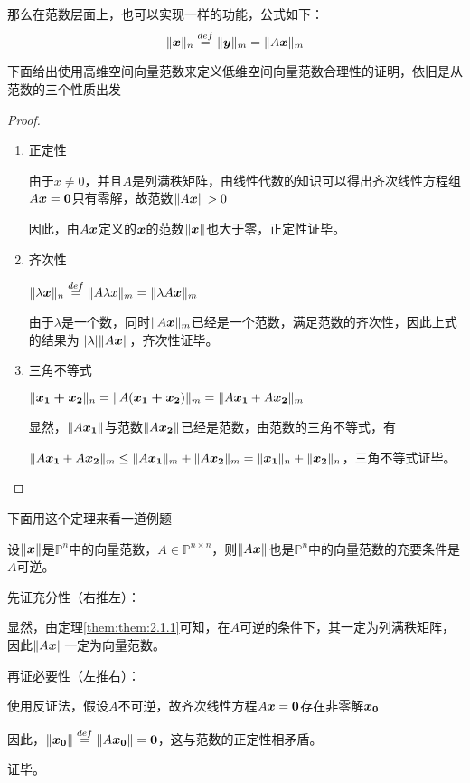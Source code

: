 \documentclass[12pt, a4paper, oneside, UTF8]{ctexbook}
\begin{document}
那么在范数层面上，也可以实现一样的功能，公式如下：
\[\Vert\boldsymbol{x}\Vert_n\overset{def}{=}\Vert\boldsymbol{y}\Vert_m=\Vert A\boldsymbol{x}\Vert_m\]


下面给出使用高维空间向量范数来定义低维空间向量范数合理性的证明，依旧是从范数的三个性质出发

\begin{proof}
    \begin{enumerate}[leftmargin=4em]
        \item 正定性
        
            由于$x\neq 0$，并且$A$是列满秩矩阵，由线性代数的知识可以得出齐次线性方程组$A\boldsymbol{x}=\boldsymbol{0}$只有零解，故范数$\Vert A\boldsymbol{x}\Vert>0$

            因此，由$A\boldsymbol{x}$定义的$\boldsymbol{x}$的范数$\Vert\boldsymbol{x}\Vert$也大于零，正定性证毕。
        \item 齐次性
        
        $\Vert\lambda\boldsymbol{x}\Vert_n\overset{def}{=}\Vert A\lambda x\Vert_m=\Vert\lambda A\boldsymbol{x}\Vert_m$

        由于$\lambda$是一个数，同时$\Vert A\boldsymbol{x}\Vert_m$已经是一个范数，满足范数的齐次性，因此上式的结果为
        $|\lambda|\Vert A\boldsymbol{x}\Vert$，齐次性证毕。
        \item 三角不等式
        
        $\Vert\boldsymbol{x_1+x_2}\Vert_n=\Vert A(\boldsymbol{x_1+x_2})\Vert_m=\Vert A\boldsymbol{x_1}+A\boldsymbol{x_2}\Vert_m$

        显然，$\Vert A\boldsymbol{x_1}\Vert$与范数$\Vert A\boldsymbol{x_2}\Vert$已经是范数，由范数的三角不等式，有

        $\Vert A\boldsymbol{x_1}+A\boldsymbol{x_2}\Vert_m\leq \Vert A\boldsymbol{x_1}\Vert_m+\Vert A\boldsymbol{x_2}\Vert_m=\Vert\boldsymbol{x_1}\Vert_n+\Vert\boldsymbol{x_2}\Vert_n$，三角不等式证毕。
    \end{enumerate}
\end{proof}

下面用这个定理来看一道例题

\begin{example}
    设$\Vert\boldsymbol{x}\Vert$是$\mathbb{P}^n$中的向量范数，$A\in\mathbb{P}^{n\times n}$，则$\Vert A\boldsymbol{x}\Vert$也是$\mathbb{P}^n$中的向量范数的充要条件是$A$可逆。
\end{example}

\begin{solution}
    先证充分性（右推左）：
    
    显然，由定理\ref{them:them:2.1.1}可知，在$A$可逆的条件下，其一定为列满秩矩阵，因此$\Vert A\boldsymbol{x}\Vert$一定为向量范数。

    再证必要性（左推右）：

    使用反证法，假设$A$不可逆，故齐次线性方程$A\boldsymbol{x}=\boldsymbol{0}$存在非零解$\boldsymbol{x_0}$

    因此，$\Vert\boldsymbol{x_0}\Vert\overset{def}{=}\Vert A\boldsymbol{x_0}\Vert=\boldsymbol{0}$，这与范数的正定性相矛盾。

    证毕。
\end{solution}
\end{document}
